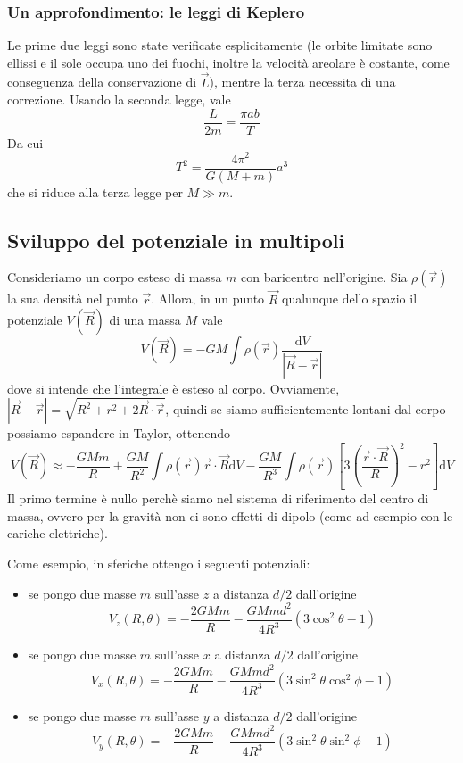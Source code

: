 \documentclass[a4paper,11pt]{article}
\begin{document}
\subsubsection{Un approfondimento: le leggi di Keplero}
Le prime due leggi sono state verificate esplicitamente (le orbite limitate sono ellissi e il sole occupa uno dei fuochi, inoltre la velocità areolare è costante, come conseguenza della conservazione di $\vec{L}$), mentre la terza necessita di una correzione. Usando la seconda legge, vale
$$\frac{L}{2m}=\frac{\pi ab}{T}$$
Da cui
$$T^2=\frac{4\pi^2}{G(M+m)}a^3$$
che si riduce alla terza legge per $M\gg m$.

\subsection{Sviluppo del potenziale in multipoli}
Consideriamo un corpo esteso di massa $m$ con baricentro nell'origine. Sia $\rho(\vec{r})$ la sua densità nel punto $\vec{r}$. Allora, in un punto $\vec{R}$ qualunque dello spazio il potenziale $V(\vec{R})$ di una massa $M$ vale
$$V(\vec{R})=-GM\int\rho(\vec{r})\frac{\mathrm{d}V}{|\vec{R}-\vec{r}|}$$
dove si intende che l'integrale è esteso al corpo. Ovviamente, $|\vec{R}-\vec{r}|=\sqrt{R^2+r^2+2\vec{R}\cdot\vec{r}}$, quindi se siamo sufficientemente lontani dal corpo possiamo espandere in Taylor, ottenendo
$$V(\vec{R})\approx-\frac{GMm}{R}+\frac{GM}{R^2}\int\rho(\vec{r})\vec{r}\cdot\vec{R}\mathrm{d}V-\frac{GM}{R^3}\int\rho(\vec{r})\left[3\left(\frac{\vec{r}\cdot\vec{R}}{R}\right)^2-r^2\right]\mathrm{d}V$$
Il primo termine è nullo perchè siamo nel sistema di riferimento del centro di massa, ovvero per la gravità non ci sono effetti di dipolo (come ad esempio con le cariche elettriche).

\noindent Come esempio, in sferiche ottengo i seguenti potenziali:
\begin{itemize}
	\item se pongo due masse $m$ sull'asse $z$ a distanza $d/2$ dall'origine
	$$V_z(R,\theta)=-\frac{2GMm}{R}-\frac{GMmd^2}{4R^3}\left(3\cos^2\theta-1\right)$$
	\item se pongo due masse $m$ sull'asse $x$ a distanza $d/2$ dall'origine
	$$V_x(R,\theta)=-\frac{2GMm}{R}-\frac{GMmd^2}{4R^3}\left(3\sin^2\theta\cos^2\phi-1\right)$$
	\item se pongo due masse $m$ sull'asse $y$ a distanza $d/2$ dall'origine
	$$V_y(R,\theta)=-\frac{2GMm}{R}-\frac{GMmd^2}{4R^3}\left(3\sin^2\theta\sin^2\phi-1\right)$$
\end{itemize}
\end{document}

